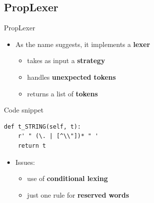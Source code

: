 \subsection{PropLexer}
\begin{frame}[fragile]{PropLexer}
  \begin{itemize}
  \item As the name suggests, it implements a {\bf lexer}
    \begin{itemize}
    \item takes as input a {\bf strategy}
    \item handles {\bf unexpected tokens}
    \item returns a list of {\bf tokens}
    \end{itemize}
  \end{itemize}
  \begin{exampleblock}{Code snippet}
\begin{verbatim}
def t_STRING(self, t):
    r' " (\. | [^\\"])* " '
    return t
\end{verbatim}
  \end{exampleblock}  
  \begin{itemize}
  \item Issues:
    \begin{itemize}
    \item use of {\bf conditional lexing}
    \item just one rule for {\bf reserved words}
    \end{itemize}
  \end{itemize}
\end{frame}
